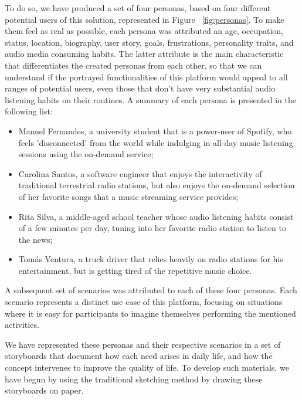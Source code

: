 To do so, we have produced a set of four personas, based on four different potential users of this solution, represented in Figure ~\ref{fig:personas}. To make them feel as real as possible, each persona was attributed an age, occupation, status, location, biography, user story, goals, frustrations, personality traits, and audio media consuming habits. The latter attribute is the main characteristic that differentiates the created personas from each other, so that we can understand if the portrayed functionalities of this platform would appeal to all ranges of potential users, even those that don't have very substantial audio listening habits on their routines. A summary of each persona is presented in the following list:

\begin{itemize}
	\item Manuel Fernandes, a university student that is a power-user of Spotify, who feels 'disconnected' from the world while indulging in all-day music listening sessions using the on-demand service;
	\item Carolina Santos, a software engineer that enjoys the interactivity of traditional terrestrial radio stations, but also enjoys the on-demand selection of her favorite songs that a music streaming service provides;
	\item Rita Silva, a middle-aged school teacher whose audio listening habits consist of a few minutes per day, tuning into her favorite radio station to listen to the news;
	\item Tomás Ventura, a truck driver that relies heavily on radio stations for his entertainment, but is getting tired of the repetitive music choice.
\end{itemize}


A subsequent set of scenarios was attributed to each of these four personas. Each scenario represents a distinct use case of this platform, focusing on situations where it is easy for participants to imagine themselves performing the mentioned activities.

We have represented these personas and their respective scenarios in a set of storyboards that document how each need arises in daily life, and how the concept intervenes to improve the quality of life. To develop such materials, we have begun by using the traditional sketching method by drawing these storyboards on paper.

